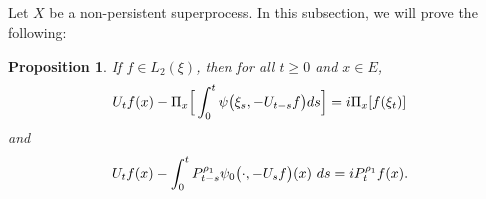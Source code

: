 \documentclass[12pt,a4paper]{amsart}
\theoremstyle{plain}
\newtheorem{prop}[thm]{Proposition}
\theoremstyle{definition}
\numberwithin{equation}{section}
\begin{document}
\subsection{}
    Let $X$ be a non-persistent superprocess.
    In this subsection, we will prove the following:
\begin{prop}
\label{prop: complex FKPP-equation}
    If $f\in L_2(\xi)$,  then for all $t\geq 0$ and $x\in E$,
\begin{equation}
\label{eq: complex FKPP-equation}
    U_tf(x) - \Pi_x \Big[\int_0^t \psi\big(\xi_s, - U_{t-s}f\big) ds \Big]
    \\= i \Pi_x [f(\xi_t)]
\end{equation}
    and
\begin{equation}
\label{eq: complex FKPP-equation with FK-transform}
    U_tf(x) -  \int_0^t P_{t-s}^{\rho_1} \psi_0\big(\cdot,-U_sf\big) (x)~ds
    \\= iP_t^{\rho_1} f(x).
\end{equation}
\end{prop}
\end{document}
